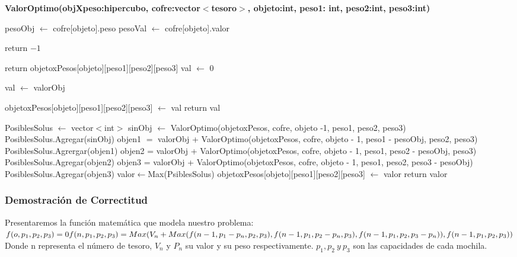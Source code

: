 \documentclass[spanish,12pt]{article}
\begin{document}
\begin{algorithm}[H]{\textbf{ValorOptimo(objXpeso:hipercubo, cofre:vector$<$tesoro$>$, objeto:int, peso1: int, peso2:int, peso3:int)}}
	\begin{algorithmic}[1]
		\State  pesoObj $\gets$ cofre[objeto].peso 
		\State  pesoVal $\gets$ cofre[objeto].valor 

			\State return $-1$ 

		\EndIf

			\State return objetoxPesos[objeto][peso1][peso2][peso3] 
		\EndIf
			\State val $\gets$ 0 

				\State val $\gets$ valorObj 

				\State objetoxPesos[objeto][peso1][peso2][peso3] $\gets$ val 
				\State return val 

			\EndIf

		\Else
			\State PosiblesSolus $\gets$ vector$<$int$>$ 
			\State sinObj $\gets$ ValorOptimo(objetoxPesos, cofre, objeto -1, peso1, peso2, peso3)
			\State PosiblesSolus.Agregar(sinObj)
				\State objen1 $=$ valorObj + ValorOptimo(objetoxPesos, cofre, objeto - 1, peso1 - pesoObj, peso2, peso3)
				\State PosiblesSolus.Agrergar(objen1)
			\EndIf
				\State objen2 = valorObj + ValorOptimo(objetoxPesos, cofre, objeto - 1, peso1, peso2  - pesoObj, peso3)
				\State PosiblesSolus.Agregar(objen2)
			\EndIf
				\State objen3 = valorObj + ValorOptimo(objetoxPesos, cofre, objeto - 1, peso1, peso2, peso3  - pesoObj)
				\State PosiblesSolus.Agregar(objen3)
			\EndIf
			\State valor$\gets$Max(PsiblesSolus)
			\State objetoxPesos[objeto][peso1][peso2][peso3] $\gets$ valor
			\State return valor
		\EndIf


	\end{algorithmic}
\end{algorithm}

\newpage

\subsubsection{Demostración de Correctitud}
Presentaremos la función matemática que modela nuestro problema:\\

$f(o,p_{1},p_{2},p_{3})=0 \\
f(n,p_{1},p_{2},p_{3}) = Max(V_{n}+Max(f(n-1,p_{1}-p_{n},p_{2},p_{3}), f(n-1,p_{1},p_{2}-p_{n},p_{3}), f(n-1,p_{1},p_{2},p_{3}-p_{n})),f(n-1,p_{1},p_{2},p_{3})) $
\\
Donde n representa el número de tesoro, $V_{n}$ y $P_{n}$ su valor y su peso respectivamente. $p_{1},p_{2}\ y \ p_{3}$ son las capacidades de cada mochila.
\end{document}

